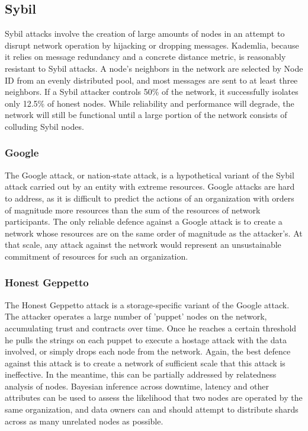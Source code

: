 \documentclass[a4paper,10pt]{article} \usepackage[utf8]{inputenc}
\begin{document}
\subsection{Sybil}

Sybil attacks involve the creation of large amounts of nodes in an attempt to
disrupt network operation by hijacking or dropping messages. Kademlia, because
it relies on message redundancy and a concrete distance metric, is reasonably
resistant to Sybil attacks. A node's neighbors in the network are selected by
Node ID from an evenly distributed pool, and most messages are sent to at least
three neighbors. If a Sybil attacker controls 50\% of the network, it
successfully isolates only 12.5\% of honest nodes. While reliability and
performance will degrade, the network will still be functional until a large
portion of the network consists of colluding Sybil nodes.

\subsubsection{Google}

The Google attack, or nation-state attack, is a hypothetical variant of the
Sybil attack carried out by an entity with extreme resources. Google attacks are
hard to address, as it is difficult to predict the actions of an organization
with orders of magnitude more resources than the sum of the resources of network
participants. The only reliable defence against a Google attack is to create a
network whose resources are on the same order of magnitude as the attacker's. At
that scale, any attack against the network would represent an unsustainable
commitment of resources for such an organization.

\subsubsection{Honest Geppetto}

The Honest Geppetto attack is a storage-specific variant of the Google attack.
The attacker operates a large number of 'puppet' nodes on the network,
accumulating trust and contracts over time. Once he reaches a certain threshold
he pulls the strings on each puppet to execute a hostage attack with the data
involved, or simply drops each node from the network. Again, the best defence
against this attack is to create a network of sufficient scale that this attack
is ineffective. In the meantime, this can be partially addressed by relatedness
analysis of nodes. Bayesian inference across downtime, latency and other
attributes can be used to assess the likelihood that two nodes are operated by
the same organization, and data owners can and should attempt to distribute
shards across as many unrelated nodes as possible.
\end{document}
